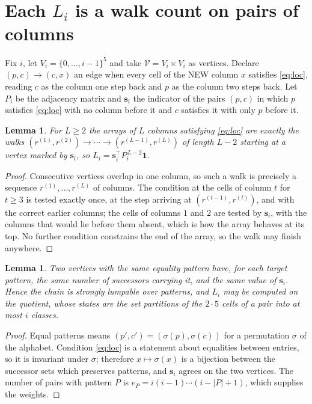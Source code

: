 \documentclass[11pt,a4paper]{article}
\theoremstyle{plain}
\newtheorem{lemma}[theorem]{Lemma}
\theoremstyle{definition}
\begin{document}
\section{Each $L_i$ is a walk count on pairs of columns}

Fix $i$, let $V_i=\{0,\dots,i-1\}^{5}$ and take $\mathcal V=V_i\times V_i$ as vertices.
Declare $(p,c)\to(c,x)$ an edge when every cell of the NEW column $x$ satisfies
\eqref{eq:loc}, reading $c$ as the column one step back and $p$ as the column two steps
back. Let $P_i$ be the adjacency matrix and $\mathbf{s}_i$ the indicator of the pairs
$(p,c)$ in which $p$ satisfies \eqref{eq:loc} with no column before it and $c$ satisfies it
with only $p$ before it.

\begin{lemma}\label{lem:walk}
For $L\ge2$ the arrays of $L$ columns satisfying \eqref{eq:loc} are exactly the walks
$(r^{(1)},r^{(2)})\to\cdots\to(r^{(L-1)},r^{(L)})$ of length $L-2$ starting at a
vertex marked by $\mathbf{s}_i$, so
$L_i=\mathbf{s}_i^{\!\top}P_i^{\,L-2}\mathbf{1}$.
\end{lemma}

\begin{proof}
Consecutive vertices overlap in one column, so such a walk is precisely a sequence
$r^{(1)},\dots,r^{(L)}$ of columns. The condition at the cells of column $t$ for $t\ge3$
is tested exactly once, at the step arriving at $(r^{(t-1)},r^{(t)})$, and with the
correct earlier columns; the cells of columns $1$ and $2$ are tested by $\mathbf{s}_i$, with
the columns that would lie before them absent, which is how the array behaves at its top. No
further condition constrains the end of the array, so the walk may finish anywhere.
\end{proof}

\begin{lemma}\label{lem:lump}
Two vertices with the same equality pattern have, for each target pattern, the same number of
successors carrying it, and the same value of $\mathbf{s}_i$. Hence the chain is strongly
lumpable over patterns, and $L_i$ may be computed on the quotient, whose states are the set
partitions of the $2\cdot5$ cells of a pair into at most $i$ classes.
\end{lemma}

\begin{proof}
Equal patterns means $(p',c')=(\sigma(p),\sigma(c))$ for a permutation $\sigma$ of the
alphabet. Condition \eqref{eq:loc} is a statement about equalities between entries, so it is
invariant under $\sigma$; therefore $x\mapsto\sigma(x)$ is a bijection between the successor
sets which preserves patterns, and $\mathbf{s}_i$ agrees on the two vertices. The number of
pairs with pattern $P$ is $e_P=i(i-1)\cdots(i-|P|+1)$, which supplies the weights.
\end{proof}
\end{document}
